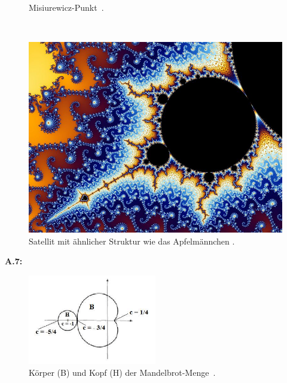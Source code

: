 \begin{figure}[H]
\begin{minipage}[t]{0.40\textwidth}
    \vspace*{-4ex}
    \caption{Misiurewicz-Punkt~\cite{beyer_partial_2005-3}.}
    \label{app:6.4}
  \end{minipage}
  \\[2ex]
  \begin{minipage}[t]{\textwidth}
    \centering
    \includegraphics[width=0.40\linewidth]{images/zoom/800px-Mandel_zoom_08_satellite_antenna}
    \vspace*{-0.4ex}
    \caption{Satellit mit ähnlicher Struktur wie das Apfelmännchen  \cite{beyer_partial_2005-4}.}
    \label{app:6.5}
  \end{minipage}
\end{figure}

\noindent\textbf{A.7:}\label{app:7}
\begin{figure}[H]
\centering
\includegraphics[width=0.5\textwidth]{images/bodyHeadMandelbrotSet}
\caption{
  Körper (B) und Kopf (H) der Mandelbrot-Menge~\cite{mahanta_mandelbrot_2016}.
}
\label{fig:body-and-head-of-mandelbrot-set}
\end{figure}

